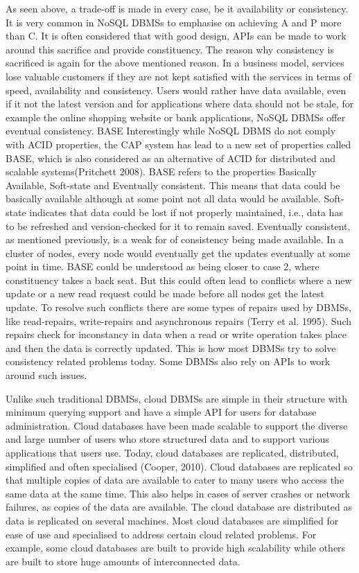As seen above, a trade-off is made in every case, be it availability or
consistency. It is very common in NoSQL DBMSs to emphasise on achieving A and P
more than C. It is often considered that with good design, APIs can be made to
work around this sacrifice and provide constituency. The reason why consistency
is sacrificed is again for the above mentioned reason. In a business model,
services lose valuable customers if they are not kept satisfied with the
services in terms of speed, availability and consistency. Users would rather
have data available, even if it not the latest version and for applications
where data should not be stale, for example the online shopping website or bank
applications, NoSQL DBMSs offer eventual consistency.
BASE Interestingly while NoSQL DBMS do not comply with ACID properties, the CAP
system has lead to a new set of properties called BASE, which is also considered
as an alternative of ACID for distributed and scalable systems(Pritchett 2008).
BASE refers to the properties Basically Available, Soft-state and Eventually
consistent. This means that data could be basically available although at some
point not all data would be available. Soft-state indicates that data could be
lost if not properly maintained, i.e., data has to be refreshed and
version-checked for it to remain saved. Eventually consistent, as mentioned
previously, is a weak for of consistency being made available. In a cluster of
nodes, every node would eventually get the updates eventually at some point in
time.
BASE could be understood as being closer to case 2, where constituency takes a
back seat. But this could often lead to conflicts where a new update or a new
read request could be made before all nodes get the latest update. To resolve
such conflicts there are some types of repairs used by DBMSs, like read-repairs,
write-repairs and asynchronous repairs (Terry et al. 1995). Such repairs check
for inconstancy in data  when a read or write operation takes place and then the
data is correctly updated. This is how most DBMSs try to solve consistency
related problems today. Some DBMSs also rely on APIs to work around such issues.

Unlike such traditional \acp{DBMS}, cloud \acp{DBMS} are simple in their
structure with minimum querying support and have a simple API for users for
database administration. Cloud databases have been made scalable to support the
diverse and large number of users who store structured data and to support
various applications that users use. Today, cloud databases are replicated,
distributed, simplified and often specialised (Cooper, 2010). Cloud databases
are replicated so that multiple copies of data are available to cater to many
users who access the same data at the same time. This also helps in cases of
server crashes or network failures, as copies of the data are available. The
cloud database are distributed as data is replicated on several machines. Most
cloud databases are simplified for ease of use and specialised to address
certain cloud related problems. For example, some cloud databases are built to
provide high scalability while others are built to store huge amounts of
interconnected data.

